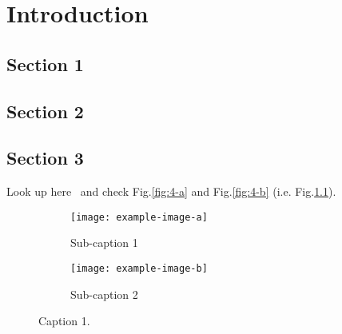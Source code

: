 \documentclass[../main.tex]{subfiles}
\begin{document}
\chapter{Introduction} %

\label{Chapter1} %


\newcommand{\keyword}[1]{\textbf{#1}}
\newcommand{\tabhead}[1]{\textbf{#1}}
\newcommand{\code}[1]{\texttt{#1}}
\newcommand{\file}[1]{\texttt{\bfseries#1}}
\newcommand{\option}[1]{\texttt{\itshape#1}}





\section{Section 1}

\lipsum[1-3]



\section{Section 2}

\lipsum[1-5]


\section{Section 3}\label{section:label_section_3}

\lipsum[2-4]
Look up here~\cite{Zorin:22} and check Fig.\ref{fig:4-a} and Fig.\ref{fig:4-b} (i.e. Fig.\ref{fig:fig_1-1}).

\begin{figure}[ht]
\centering
    \begin{subfigure}[t]{.59\columnwidth}
      \texttt{[image: example-image-a]}
      \caption{Sub-caption 1}
    \end{subfigure}
    \begin{subfigure}[t]{.39\columnwidth}
      \texttt{[image: example-image-b]}
      \caption{Sub-caption 2}
    \end{subfigure}
    \caption{Caption 1.}
    \label{fig:fig_1-1}
\end{figure}
\end{document}
